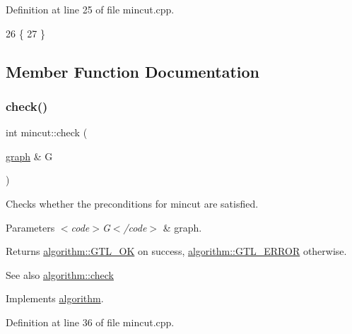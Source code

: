 Definition at line 25 of file mincut.\+cpp.


\begin{DoxyCode}
26 \{
27 \}
\end{DoxyCode}


\subsection{Member Function Documentation}
\mbox{\label{classmincut_a3a06737106ab6000360a1f799361691a}} 
\subsubsection{\texorpdfstring{check()}{check()}}
{\footnotesize\ttfamily int mincut\+::check (\begin{DoxyParamCaption}\item[{\mbox{\hyperlink{classgraph}{graph}} \&}]{G }\end{DoxyParamCaption})\hspace{0.3cm}{\ttfamily [virtual]}}

Checks whether the preconditions for mincut are satisfied.


\begin{DoxyParams}{Parameters}
{\em $<$code$>$\+G$<$/code$>$} & graph. \\
\hline
\end{DoxyParams}
\begin{DoxyReturn}{Returns}
{\ttfamily \mbox{\hyperlink{classalgorithm_af1a0078e153aa99c24f9bdf0d97f6710a5114c20e4a96a76b5de9f28bf15e282b}{algorithm\+::\+G\+T\+L\+\_\+\+OK}}} on success, {\ttfamily \mbox{\hyperlink{classalgorithm_af1a0078e153aa99c24f9bdf0d97f6710a6fcf574690bbd6cf710837a169510dd7}{algorithm\+::\+G\+T\+L\+\_\+\+E\+R\+R\+OR}}} otherwise. 
\end{DoxyReturn}
\begin{DoxySeeAlso}{See also}
\mbox{\hyperlink{classalgorithm_a76361fb03ad1cf643affc51821e43bed}{algorithm\+::check}} 
\end{DoxySeeAlso}


Implements \mbox{\hyperlink{classalgorithm_a76361fb03ad1cf643affc51821e43bed}{algorithm}}.



Definition at line 36 of file mincut.\+cpp.


